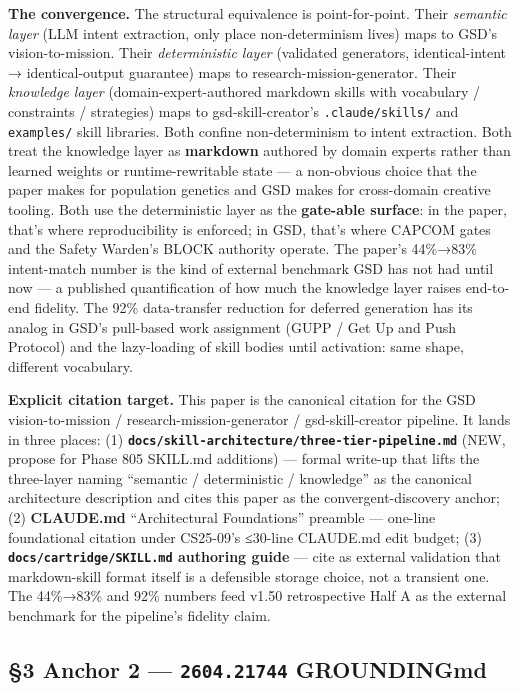\documentclass[11pt,letterpaper]{article}
\newcommand{\arxivid}[1]{\texttt{\textcolor{accent}{#1}}}
\begin{document}
\textbf{The convergence.} The structural equivalence is point-for-point.
Their \emph{semantic layer} (LLM intent extraction, only place
non-determinism lives) maps to GSD's vision-to-mission. Their
\emph{deterministic layer} (validated generators, identical-intent →
identical-output guarantee) maps to research-mission-generator. Their
\emph{knowledge layer} (domain-expert-authored markdown skills with
vocabulary / constraints / strategies) maps to gsd-skill-creator's
\texttt{.claude/skills/} and \texttt{examples/} skill libraries. Both
confine non-determinism to intent extraction. Both treat the knowledge
layer as \textbf{markdown} authored by domain experts rather than
learned weights or runtime-rewritable state --- a non-obvious choice
that the paper makes for population genetics and GSD makes for
cross-domain creative tooling. Both use the deterministic layer as the
\textbf{gate-able surface}: in the paper, that's where reproducibility
is enforced; in GSD, that's where CAPCOM gates and the Safety Warden's
BLOCK authority operate. The paper's 44\%→83\% intent-match number is
the kind of external benchmark GSD has not had until now --- a published
quantification of how much the knowledge layer raises end-to-end
fidelity. The 92\% data-transfer reduction for deferred generation has
its analog in GSD's pull-based work assignment (GUPP / Get Up and Push
Protocol) and the lazy-loading of skill bodies until activation: same
shape, different vocabulary.

\textbf{Explicit citation target.} This paper is the canonical citation
for the GSD vision-to-mission / research-mission-generator /
gsd-skill-creator pipeline. It lands in three places: (1)
\textbf{\texttt{docs/skill-architecture/three-tier-pipeline.md}} (NEW,
propose for Phase 805 SKILL.md additions) --- formal write-up that lifts
the three-layer naming ``semantic / deterministic / knowledge'' as the
canonical architecture description and cites this paper as the
convergent-discovery anchor; (2) \textbf{CLAUDE.md} ``Architectural
Foundations'' preamble --- one-line foundational citation under
CS25-09's ≤30-line CLAUDE.md edit budget; (3)
\textbf{\texttt{docs/cartridge/SKILL.md} authoring guide} --- cite as
external validation that markdown-skill format itself is a defensible
storage choice, not a transient one. The 44\%→83\% and 92\% numbers feed
v1.50 retrospective Half A as the external benchmark for the pipeline's
fidelity claim.

\subsection{\texorpdfstring{§3 Anchor 2 --- \arxivid{2604.21744}
GROUNDINGmd}{§3 Anchor 2 --- \arxivid{2604.21744} GROUNDINGmd}}
\end{document}
